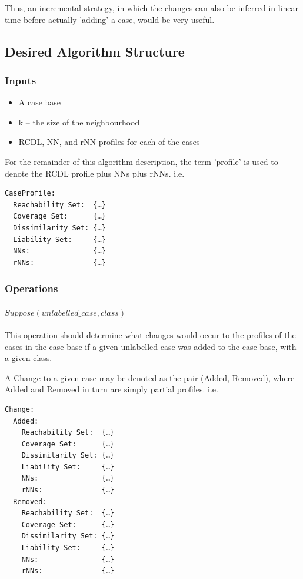 \documentclass[a4paper,11pt]{report}
\begin{document}
Thus, an incremental strategy, in which the changes can also be inferred in linear time before actually 'adding' a case, would be very useful.

\subsection{Desired Algorithm Structure}
\subsubsection{Inputs}
\begin{itemize}
	\item A case base 
	\item k – the size of the neighbourhood
	\item RCDL, NN, and rNN profiles for each of the cases
\end{itemize}

For the remainder of this algorithm description, the term 'profile' is used to denote the RCDL profile plus NNs plus rNNs. i.e. 
\begin{verbatim}
CaseProfile:  
  Reachability Set:  {…}
  Coverage Set:      {…}
  Dissimilarity Set: {…}
  Liability Set:     {…}
  NNs:               {…}
  rNNs:              {…}
\end{verbatim}

\subsubsection{Operations}
\paragraph{$Suppose(unlabelled\_case, class)$}
This operation should determine what changes would occur to the profiles of the cases in the case base if a given unlabelled case was added to the case base, with a given class.

A Change to a given case may be denoted as the pair (Added, Removed), where Added and Removed in turn are simply partial profiles. i.e.
\begin{verbatim}
Change:
  Added:
    Reachability Set:  {…}
    Coverage Set:      {…}
    Dissimilarity Set: {…}
    Liability Set:     {…}
    NNs:               {…}
    rNNs:              {…}
  Removed:
    Reachability Set:  {…}
    Coverage Set:      {…}
    Dissimilarity Set: {…}
    Liability Set:     {…}
    NNs:               {…}
    rNNs:              {…}
\end{verbatim}
\end{document}
